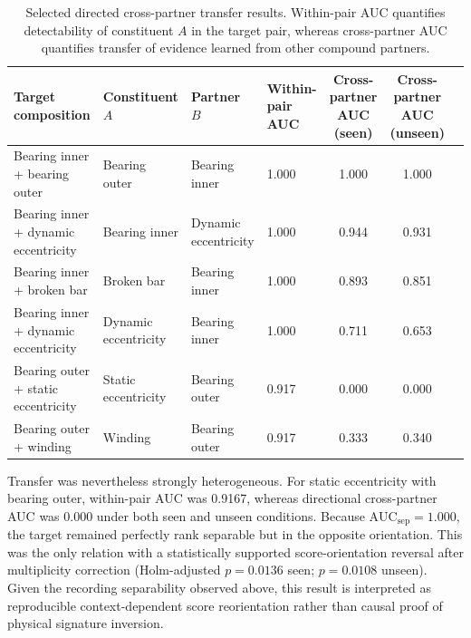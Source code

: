 \documentclass{ieeeaccess}
\begin{document}
\begin{table}[t]
\caption{Selected directed cross-partner transfer results. Within-pair AUC
quantifies detectability of constituent $A$ in the target pair, whereas
cross-partner AUC quantifies transfer of evidence learned from other compound
partners.}
\label{tab:transfer_examples}
\centering
\footnotesize
\begin{tabular}{llllccc}
\toprule
Target composition &
Constituent $A$ &
Partner $B$ &
\makecell{Within-pair\\AUC} &
\makecell{Cross-partner\\AUC (seen)} &
\makecell{Cross-partner\\AUC (unseen)} \\
\midrule

Bearing inner + bearing outer
& Bearing outer
& Bearing inner
& 1.000
& 1.000
& 1.000 \\

Bearing inner + dynamic eccentricity
& Bearing inner
& Dynamic eccentricity
& 1.000
& 0.944
& 0.931 \\

Bearing inner + broken bar
& Broken bar
& Bearing inner
& 1.000
& 0.893
& 0.851 \\

Bearing inner + dynamic eccentricity
& Dynamic eccentricity
& Bearing inner
& 1.000
& 0.711
& 0.653 \\

Bearing outer + static eccentricity
& Static eccentricity
& Bearing outer
& 0.917
& 0.000
& 0.000 \\

Bearing outer + winding
& Winding
& Bearing outer
& 0.917
& 0.333
& 0.340 \\

\bottomrule
\end{tabular}
\end{table}

Transfer was nevertheless strongly heterogeneous. For static eccentricity with bearing outer, within-pair AUC was 0.9167, whereas directional cross-partner AUC was 0.000 under both seen and unseen conditions. Because $\mathrm{AUC}_{\mathrm{sep}}=1.000$, the target remained perfectly rank separable but in the opposite orientation. This was the only relation with a statistically supported score-orientation reversal after multiplicity correction (Holm-adjusted $p=0.0136$ seen; $p=0.0108$ unseen). Given the recording separability observed above, this result is interpreted as reproducible context-dependent score reorientation rather than causal proof of physical signature inversion.
\end{document}

